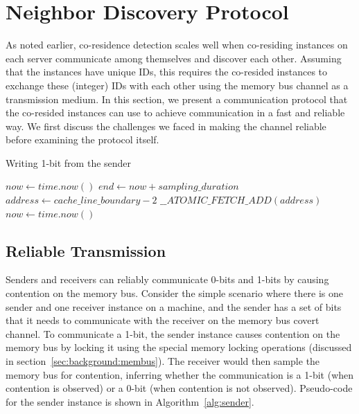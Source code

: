 \section{Neighbor Discovery Protocol}
\label{sec:technique}
 
As noted earlier, co-residence detection scales well when co-residing instances
on each server communicate among themselves and discover each other.  Assuming
that the instances have unique IDs, this requires the co-resided instances to
exchange these (integer) IDs with each other using the memory bus channel as a
transmission medium. In this section, we present a communication protocol that
the co-resided instances can use to achieve communication in a fast and reliable
way. We first discuss the challenges we faced in making the channel reliable
before examining the protocol itself.

\begin{algorithm}[!t]
\caption{Writing 1-bit from the sender}
\label{alg:sender}
\begin{algorithmic}
\STATE $now \leftarrow  time.now()$
\STATE $end \leftarrow now + sampling\_duration$
\STATE $address \leftarrow cache\_line\_boundary-2$
    \STATE $\_\_ATOMIC\_FETCH\_ADD(address)$
    \STATE $now \leftarrow  time.now()$
\ENDWHILE
\end{algorithmic}
\end{algorithm}

\subsection{Reliable Transmission}
Senders and receivers can reliably communicate 0-bits and 1-bits by causing
contention on the memory bus.  Consider the simple scenario where there is one
sender and one receiver instance on a machine, and the sender has a set of bits
that it needs to communicate with the receiver on the memory bus covert channel.
To communicate a 1-bit, the sender instance causes contention on the memory bus
by locking it using the special memory locking operations (discussed in
section~\ref{sec:background:membus}). The receiver would then sample the memory
bus for contention, inferring whether the communication is a 1-bit (when
contention is observed) or a 0-bit (when contention is not observed).
Pseudo-code for the sender instance is shown in Algorithm~\ref{alg:sender}.

